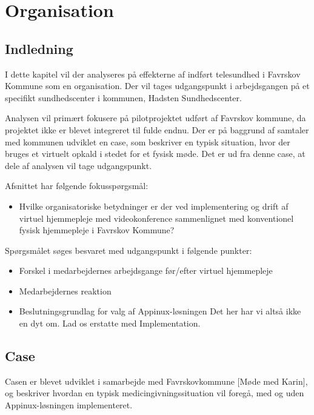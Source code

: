 \chapter{Organisation}

\section{Indledning}
I dette kapitel vil der analyseres på effekterne af indført telesundhed i Favrskov Kommune som en organisation. Der vil tages udgangspunkt i arbejdsgangen på et specifikt sundhedscenter i kommunen, Hadsten Sundhedscenter. 

Analysen vil primært fokusere på pilotprojektet udført af Favrskov kommune, da projektet ikke er blevet integreret til fulde endnu. Der er på baggrund af samtaler med kommunen udviklet en case, som beskriver en typisk situation, hvor der bruges et virtuelt opkald i stedet for et fysisk møde. Det er ud fra denne case, at dele af analysen vil tage udgangspunkt.

Afsnittet har følgende fokusspørgsmål:
\begin{itemize}
\item{Hvilke organisatoriske betydninger er der ved implementering og drift af virtuel hjemmepleje med videokonference sammenlignet med konventionel fysisk hjemmepleje i Favrskov Kommune?}
\end{itemize}
Spørgsmålet søges besvaret med udgangspunkt i følgende punkter:
\begin{itemize}
\item{Forskel i medarbejdernes arbejdsgange før/efter virtuel hjemmepleje}
\item{Medarbejdernes reaktion}
\item{Beslutningsgrundlag for valg af Appinux-løsningen Det her har vi altså ikke en dyt om. Lad os erstatte med Implementation.}
\end{itemize}
\section{Case}
Casen er blevet udviklet i samarbejde med Favrskovkommune [Møde med Karin], og beskriver hvordan en typisk medicingivningssituation vil foregå, med og uden Appinux-løsningen implementeret. 

